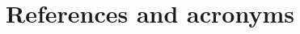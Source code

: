 \documentclass[10pt,a4paper]{article}
\begin{document}
\section{References and acronyms}

\printglossaries


%
%

%


\listoffigures

\end{document}
